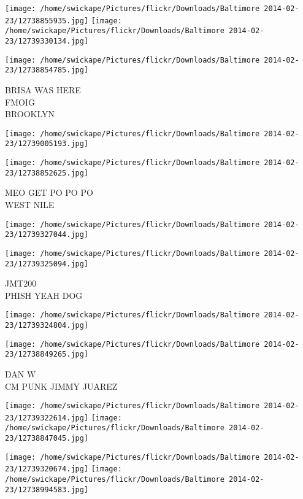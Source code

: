 \documentclass[10pt,letterpaper]{article}
\begin{document}
\texttt{[image: /home/swickape/Pictures/flickr/Downloads/Baltimore 2014-02-23/12738855935.jpg]}
\texttt{[image: /home/swickape/Pictures/flickr/Downloads/Baltimore 2014-02-23/12739330134.jpg]}

\texttt{[image: /home/swickape/Pictures/flickr/Downloads/Baltimore 2014-02-23/12738854785.jpg]}

BRISA WAS HERE\\
FMOIG\\
BROOKLYN\\
\pagebreak

\texttt{[image: /home/swickape/Pictures/flickr/Downloads/Baltimore 2014-02-23/12739005193.jpg]}

\vspace{0.25in}
\texttt{[image: /home/swickape/Pictures/flickr/Downloads/Baltimore 2014-02-23/12738852625.jpg]}

MEO GET PO PO PO\\
WEST NILE\\
\pagebreak

\texttt{[image: /home/swickape/Pictures/flickr/Downloads/Baltimore 2014-02-23/12739327044.jpg]}

\vspace{0.25in}
\texttt{[image: /home/swickape/Pictures/flickr/Downloads/Baltimore 2014-02-23/12739325094.jpg]}

JMT200\\
PHISH YEAH DOG\\
\pagebreak

\texttt{[image: /home/swickape/Pictures/flickr/Downloads/Baltimore 2014-02-23/12739324804.jpg]}

\vspace{0.25in}
\texttt{[image: /home/swickape/Pictures/flickr/Downloads/Baltimore 2014-02-23/12738849265.jpg]}

DAN W\\
CM PUNK JIMMY JUAREZ\\
\pagebreak

\texttt{[image: /home/swickape/Pictures/flickr/Downloads/Baltimore 2014-02-23/12739322614.jpg]}
\texttt{[image: /home/swickape/Pictures/flickr/Downloads/Baltimore 2014-02-23/12738847045.jpg]}

\texttt{[image: /home/swickape/Pictures/flickr/Downloads/Baltimore 2014-02-23/12739320674.jpg]}
\texttt{[image: /home/swickape/Pictures/flickr/Downloads/Baltimore 2014-02-23/12738994583.jpg]}
\end{document}
